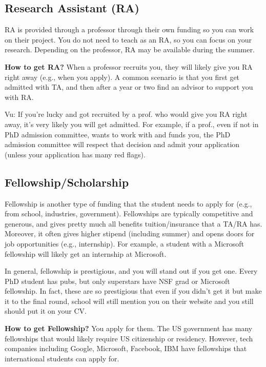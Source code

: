 \documentclass[11pt]{article}
\newenvironment{commentbox}{
 \small
    \begin{cbox}
 }{
   \end{cbox}
}
\begin{document}
\subsection{Research Assistant (RA)}
RA is provided through a professor through their own funding so you can work on their project.  
You do not need to teach as an RA, so you can focus on your research. Depending on the professor, RA may be available during the summer.

\textbf{How to get RA?} When a professor recruits you, they will likely give you RA right away (e.g., when you apply).  A common scenario is that you first get admitted with TA, and then after a year or two find an advisor to support you with RA. 


\begin{commentbox}
Vu: If you're lucky and got recruited by a prof. who would give you RA right away, it's very likely you will get admitted.  For example, if a prof., even if not in PhD admission committee, wants to work with and funds you, the PhD admission committee will respect that decision and admit your application (unless your application has many red flags).
\end{commentbox}

\subsection{Fellowship/Scholarship}

Fellowship is another type of funding that the student needs to apply for (e.g., from school, industries, government). Fellowships are typically competitive and generous, and gives pretty much all benefits tuition/insurance that a TA/RA has.  Moreover, it often gives higher stipend (including summer) and opens doors for job opportunities (e.g., internship).  For example, a student with a Microsoft fellowship will likely get an internship at Microsoft.  

In general, fellowship is prestigious, and you will stand out if you get one.  Every PhD student has pubs, but only superstars have NSF grad or Microsoft fellowship. In fact, these are so prestigious that even if you didn't get it but make it to the final round, school will still mention you on their website and you still should put it on your CV.


\textbf{How to get Fellowship?} You apply for them.  The US government has many fellowships that would likely require US citizenship or residency.  However, tech companies including Google, Microsoft, Facebook, IBM have fellowships that international students can apply for. 
\end{document}
